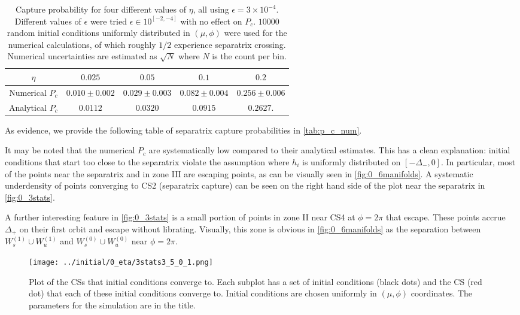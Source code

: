 \documentclass[
        fleqn,
        usenatbib,
    ]{mnras}
\begin{document}
\begin{table*}
    \centering
    \begin{tabular}{c|c c c c}
        $\eta$ & $0.025$ & $0.05$ & $0.1$ & $0.2$\\\midrule
        Numerical $P_c$ & $0.010 \pm 0.002$ & $0.029 \pm 0.003$
            & $0.082 \pm 0.004$ & $0.256 \pm 0.006$ \\
        Analytical $P_c$ & $0.0112$ & $0.0320$ & $0.0915$ & $0.2627$.
    \end{tabular}
    \caption{Capture probability for four different values of $\eta$, all using
    $\epsilon = 3 \times 10^{-4}$. Different values of $\epsilon$ were tried
    $\epsilon \in 10^{[-2, -4]}$ with no effect on $P_c$. $10000$ random initial
    conditions uniformly distributed in $(\mu, \phi)$ were used for the
    numerical calculations, of which roughly $1/2$ experience separatrix
    crossing. Numerical uncertainties are estimated as $\sqrt{N}$ where $N$ is
    the count per bin.}\label{tab:p_c_num}
\end{table*}
As evidence, we provide the following table of separatrix capture probabilities
in \autoref{tab:p_c_num}.

It may be noted that the numerical $P_c$ are systematically low compared to
their analytical estimates. This has a clean explanation: initial conditions
that start too close to the separatrix violate the assumption where $h_i$ is
uniformly distributed on $[-\Delta_-, 0]$. In particular, most of the points
near the separatrix and in zone III are escaping points, as can be visually seen
in \autoref{fig:0_6manifolds}. A systematic underdensity of points converging to
CS2 (separatrix capture) can be seen on the right hand side of the plot near the
separatrix in \autoref{fig:0_3stats}.

A further interesting feature in \autoref{fig:0_3stats} is a small portion of
points in zone II near CS4  at $\phi = 2\pi$ that escape. These points accrue
$\Delta_+$ on their first orbit and escape without librating. Visually, this
zone is obvious in \autoref{fig:0_6manifolds} as the separation between
$W_s^{(1)} \cup W_u^{(1)}$ and $W_s^{(0)} \cup W_u^{(0)}$ near $\phi = 2\pi$.
\begin{figure}
    \centering
    \texttt{[image: ../initial/0\_eta/3stats3\_5\_0\_1.png]}
    \caption{Plot of the CSs that initial conditions converge to. Each subplot
    has a set of initial conditions (black dots) and the CS (red dot) that each
    of these initial conditions converge to. Initial conditions are chosen
    uniformly in $(\mu, \phi)$ coordinates. The parameters for the simulation
    are in the title.}\label{fig:0_3stats}
\end{figure}
\end{document}
